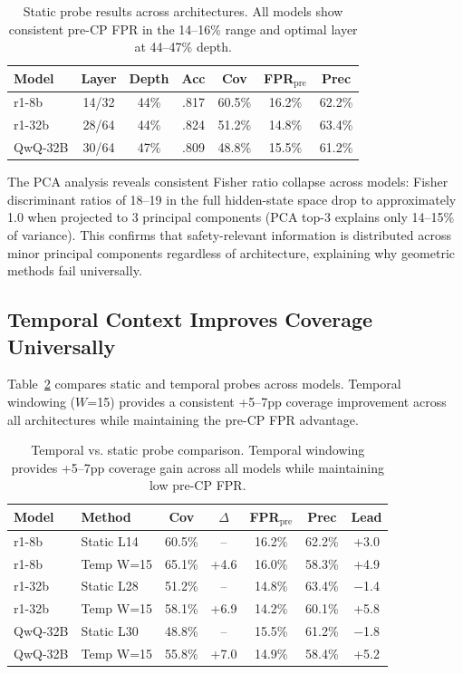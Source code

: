\documentclass[11pt,a4paper]{article}
\begin{document}
\begin{table}[t]
\centering
\small
\caption{Static probe results across architectures. All models show consistent pre-CP FPR in the 14--16\% range and optimal layer at 44--47\% depth.}
\label{tab:static_cross}
\begin{tabular}{lcccccc}
\toprule
Model & Layer & Depth & Acc & Cov & FPR$_{\text{pre}}$ & Prec \\
\midrule
r1-8b & 14/32 & 44\% & .817 & 60.5\% & 16.2\% & 62.2\% \\
r1-32b & 28/64 & 44\% & .824 & 51.2\% & 14.8\% & 63.4\% \\
QwQ-32B & 30/64 & 47\% & .809 & 48.8\% & 15.5\% & 61.2\% \\
\bottomrule
\end{tabular}
\end{table}

The PCA analysis reveals consistent Fisher ratio collapse across models: Fisher discriminant ratios of 18--19 in the full hidden-state space drop to approximately 1.0 when projected to 3 principal components (PCA top-3 explains only 14--15\% of variance). This confirms that safety-relevant information is distributed across minor principal components regardless of architecture, explaining why geometric methods fail universally.

\subsection{Temporal Context Improves Coverage Universally}

Table~\ref{tab:temporal_cross} compares static and temporal probes across models. Temporal windowing ($W$=15) provides a consistent +5--7pp coverage improvement across all architectures while maintaining the pre-CP FPR advantage.

\begin{table}[t]
\centering
\small
\caption{Temporal vs. static probe comparison. Temporal windowing provides +5--7pp coverage gain across all models while maintaining low pre-CP FPR.}
\label{tab:temporal_cross}
\begin{tabular}{llccccc}
\toprule
Model & Method & Cov & $\Delta$ & FPR$_{\text{pre}}$ & Prec & Lead \\
\midrule
r1-8b & Static L14 & 60.5\% & -- & 16.2\% & 62.2\% & +3.0 \\
r1-8b & Temp W=15 & 65.1\% & +4.6 & 16.0\% & 58.3\% & +4.9 \\
\midrule
r1-32b & Static L28 & 51.2\% & -- & 14.8\% & 63.4\% & $-$1.4 \\
r1-32b & Temp W=15 & 58.1\% & +6.9 & 14.2\% & 60.1\% & +5.8 \\
\midrule
QwQ-32B & Static L30 & 48.8\% & -- & 15.5\% & 61.2\% & $-$1.8 \\
QwQ-32B & Temp W=15 & 55.8\% & +7.0 & 14.9\% & 58.4\% & +5.2 \\
\bottomrule
\end{tabular}
\end{table}
\end{document}

